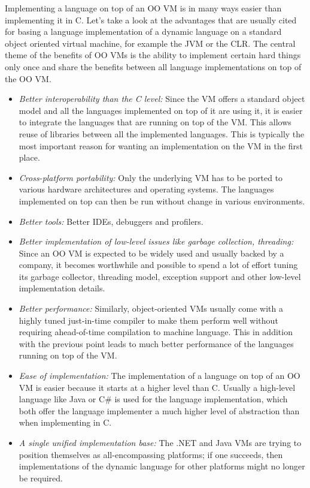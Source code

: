 \documentclass[utf8x]{llncs}
\begin{document}
Implementing a language on top of an OO VM is in many ways easier than
implementing it in C. Let's take a look at the advantages that are usually
cited for basing a
language implementation of a dynamic language on a standard object oriented
virtual machine, for example the JVM or the CLR. The central theme of the
benefits  of OO VMs is the ability to implement certain hard things only once
and share the benefits between all language implementations on top of the OO VM.

\begin{itemize}
\item
\emph{Better interoperability than the C level:} Since the VM offers a standard
object model and all the languages implemented on top of it are using it, it is
easier to integrate the languages that are running on top of the VM. This
allows reuse of libraries between all the implemented languages. This is
typically the most important reason for wanting an implementation on the VM in
the first place.

\item
\emph{Cross-platform portability:} Only the underlying VM has to be ported to
various hardware architectures and operating systems. The languages implemented
on top can then be run without change in various environments.

\item
\emph{Better tools:} Better IDEs, debuggers and profilers.

\item
\emph{Better implementation of low-level issues like garbage collection,
threading:} Since an OO VM is expected to be widely used and usually backed by
a company, it becomes worthwhile and possible to spend a lot of effort tuning
its garbage collector, threading model, exception support and other low-level
implementation details.

\item
\emph{Better performance:} Similarly, object-oriented VMs usually come with a
highly tuned just-in-time compiler to make them perform well without requiring
ahead-of-time compilation to machine language. This in addition with the
previous point leads to much better performance of the languages running on top
of the VM.

\item
\emph{Ease of implementation:} The implementation of a language on top of an OO
VM is easier because it starts at a higher level than C. Usually a
high-level language like Java or C\# is used for the language implementation,
which both offer the language implementer a much higher level of abstraction
than when implementing in C. 

\item
\emph{A single unified implementation base:} The .NET and Java VMs are trying
to position themselves as all-encompassing platforms; if one succeeds, then
implementations of the dynamic language for other platforms might no longer
be required.
\end{itemize}
\end{document}
